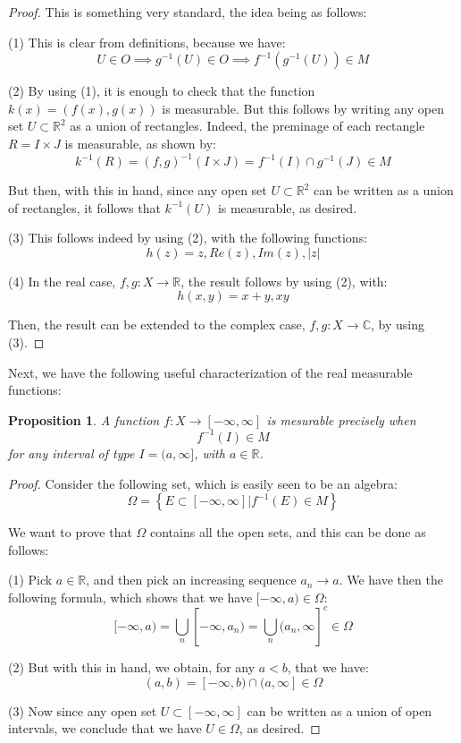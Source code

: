 \documentclass[12pt]{amsbook}
\newtheorem{proposition}[theorem]{Proposition}
\begin{document}
\begin{proof}
This is something very standard, the idea being as follows:

\medskip

(1) This is clear from definitions, because we have:
$$U\in O\implies g^{-1}(U)\in O\implies f^{-1}(g^{-1}(U))\in M$$

(2) By using (1), it is enough to check that the function $k(x)=(f(x),g(x))$ is measurable. But this follows by writing any open set $U\subset\mathbb R^2$ as a union of rectangles. Indeed, the preminage of each rectangle $R=I\times J$ is measurable, as shown by:
$$k^{-1}(R)
=(f,g)^{-1}(I\times J)
=f^{-1}(I)\cap g^{-1}(J)
\in M$$

But then, with this in hand, since any open set $U\subset\mathbb R^2$ can be written as a  union of rectangles, it follows that $k^{-1}(U)$ is measurable, as desired.

\medskip

(3) This follows indeed by using (2), with the following functions:
$$h(z)=z,Re(z),Im(z),|z|$$

(4) In the real case, $f,g:X\to\mathbb R$, the result follows by using (2), with:
$$h(x,y)=x+y,xy$$

Then, the result can be extended to the complex case, $f,g:X\to\mathbb C$, by using (3).
\end{proof}

Next, we have the following useful characterization of the real measurable functions:

\begin{proposition}
A function $f:X\to[-\infty,\infty]$ is mesurable precisely when 
$$f^{-1}(I)\in M$$
for any interval of type $I=(a,\infty]$, with $a\in\mathbb R$. 
\end{proposition}

\begin{proof}
Consider the following set, which is easily seen to be an algebra:
$$\Omega=\left\{E\subset[-\infty,\infty]\Big|f^{-1}(E)\in M\right\}$$

We want to prove that $\Omega$ contains all the open sets, and this can be done as follows:

\medskip

(1) Pick $a\in\mathbb R$, and then pick an increasing sequence $a_n\to a$. We have then the following formula, which shows that we have $[-\infty,a)\in\Omega$:
$$[-\infty,a)=\bigcup_n[-\infty,a_n)=\bigcup_n(a_n,\infty]^c\in\Omega$$

(2) But with this in hand, we obtain, for any $a<b$, that we have:
$$(a,b)=[-\infty,b)\cap(a,\infty]\in\Omega$$

(3) Now since any open set $U\subset[-\infty,\infty]$ can be written as a union of open intervals, we conclude that we have $U\in\Omega$, as desired.
\end{proof}
\end{document}
